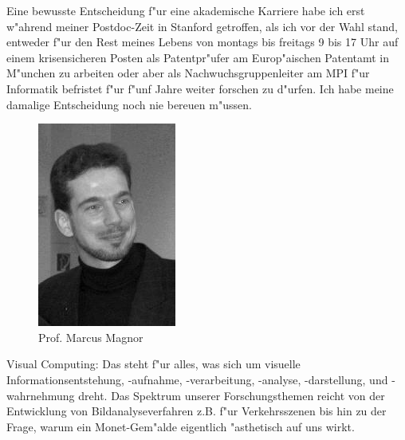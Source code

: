 Eine bewusste Entscheidung f"ur eine akademische Karriere habe ich erst w"ahrend meiner Postdoc-Zeit in Stanford getroffen, als ich vor der Wahl stand, entweder f"ur den Rest meines Lebens von montags bis freitags 9 bis 17 Uhr auf einem krisensicheren Posten als Patentpr"ufer am Europ"aischen Patentamt in M"unchen zu arbeiten oder aber als Nachwuchsgruppenleiter am MPI f"ur Informatik befristet f"ur f"unf Jahre weiter forschen zu d"urfen. Ich habe meine damalige Entscheidung noch nie bereuen m"ussen.

\begin{figure}[h]
	\centering\includegraphics[width=0.7\linewidth]{bilder/magnor.jpg}\\
	Prof. Marcus Magnor
\end{figure}


Visual Computing: Das steht f"ur alles, was sich um visuelle Informationsentstehung, -aufnahme, -verarbeitung, -analyse, -darstellung, und -wahrnehmung dreht. Das Spektrum unserer Forschungsthemen reicht von der Entwicklung von Bildanalyseverfahren z.B. f"ur Verkehrsszenen bis hin zu der Frage, warum ein Monet-Gem"alde eigentlich "asthetisch auf uns wirkt.

